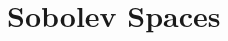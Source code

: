 \documentclass[../FEM.tex]{subfiles}
\begin{document}
\section{Sobolev Spaces}%
\label{sec:sobolev_spaces}


   
\end{document}
